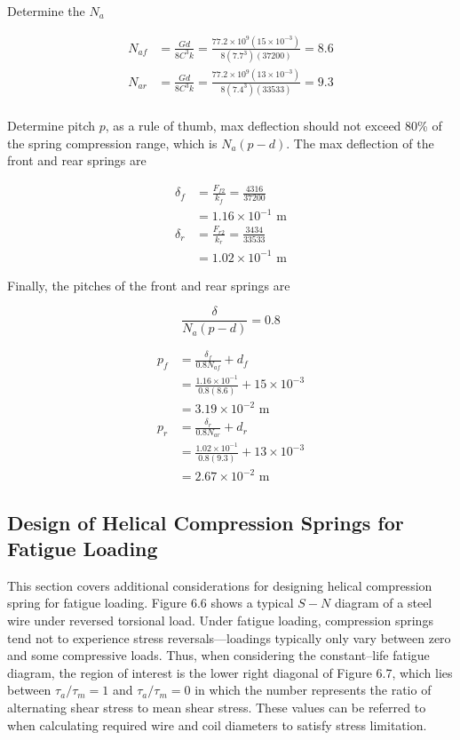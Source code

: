 \documentclass[a4paper,openany,12pt]{book}
\begin{document}
{{Determine the \(N_a\)

$$\begin{aligned}
    N_{af} &= \frac{Gd}{8C^3k} = \frac{77.2 \times 10^9(15 \times 10^{-3})}{8(7.7^3)(37200)} = 8.6 \\
    N_{ar} &= \frac{Gd}{8C^3k} = \frac{77.2 \times 10^9(13 \times 10^{-3})}{8(7.4^3)(33533)} = 9.3 \\
  \end{aligned}$$

Determine pitch \(p\), as a rule of thumb, max deflection should not
exceed 80\% of the spring compression range, which is \(N_a(p - d)\). The
max deflection of the front and rear springs are

$$\begin{aligned}
    \delta_f &= \frac{F_{f2}}{k_f} = \frac{4316}{37200} \\
             &= 1.16 \times 10^{-1} \text{ m} \\
    \delta_r &= \frac{F_{r2}}{k_r} = \frac{3434}{33533} \\
             &= 1.02 \times 10^{-1} \text{ m}
  \end{aligned}$$

Finally, the pitches of the front and rear springs are

$$\frac{\delta}{N_a(p - d)} = 0.8$$

$$\begin{aligned}
    p_f &= \frac{\delta_f}{0.8N_{af}} + d_f \\ 
          &= \frac{1.16 \times 10^{-1}}{0.8(8.6)} + 15 \times 10^{-3} \\ 
          &= 3.19 \times 10^{-2} \text{ m} \\
    p_r &= \frac{\delta_r}{0.8N_{ar}} + d_r \\ 
          &= \frac{1.02 \times 10^{-1}}{0.8(9.3)} + 13 \times 10^{-3} \\ 
          &= 2.67 \times 10^{-2} \text{ m}
  \end{aligned}$$

\subsection{Design of Helical Compression Springs for Fatigue Loading}
\label{sec:org263ee2c}
This section covers additional considerations for designing helical
compression spring for fatigue loading. Figure 6.6 shows a typical \(S-N\)
diagram of a steel wire under reversed torsional load. Under fatigue
loading, compression springs tend not to experience stress
reversals---loadings typically only vary between zero and some
compressive loads. Thus, when considering the constant--life fatigue
diagram, the region of interest is the lower right diagonal of Figure
6.7, which lies between \(\tau_a / \tau_m = 1\) and \(\tau_a / \tau_m = 0\)
in which the number represents the ratio of alternating shear stress to
mean shear stress. These values can be referred to when calculating
required wire and coil diameters to satisfy stress limitation.

}}
\end{document}
